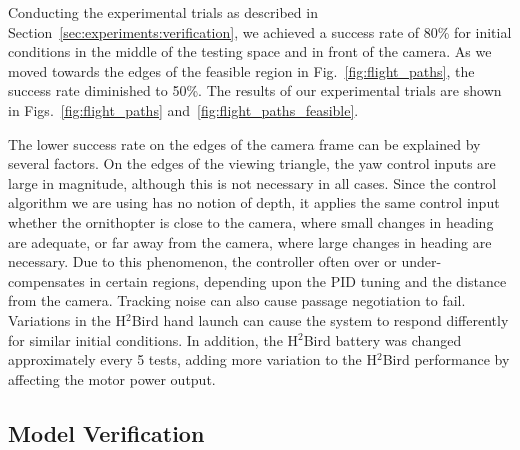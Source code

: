 \documentclass{aamas2013}
\begin{document}
Conducting the experimental trials as described in Section~\ref{sec:experiments:verification}, we achieved a success rate of 80\% for
initial conditions in the middle of the testing space and in front of the
camera. As we moved towards the edges of the
feasible region in Fig.~\ref{fig:flight_paths}, the success rate diminished
to 50\%. The results of our experimental trials are shown in
Figs.~\ref{fig:flight_paths} and~\ref{fig:flight_paths_feasible}.

The lower success rate on the edges of the camera frame can be explained by several factors. On the edges of the viewing triangle, the yaw
control inputs are large in magnitude, although this is not necessary in all
cases. Since the control algorithm we are using has no notion of depth, it
applies the same control input whether the ornithopter is close to the camera,
where small changes in heading are adequate, or far away from the camera,
where large changes in heading are necessary. Due to this phenomenon, the
controller often over or under-compensates in certain regions, depending upon
the PID tuning and the distance from the camera. Tracking noise can also cause
passage negotiation to fail. Variations in the H$^2$Bird hand launch can cause
the system to respond differently for similar initial conditions. In addition,
the H$^2$Bird battery was changed approximately every 5 tests, adding more
variation to the H$^2$Bird performance by affecting the motor power output.

\subsection{Model Verification}
\end{document}
